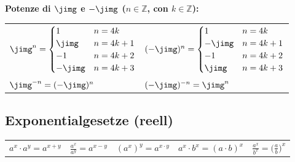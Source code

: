 \noindent\textbf{Potenze di $\jimg$ e $-\jimg$ ($n \in \mathbb{Z}$, con $k \in \mathbb{Z}$):}
\begin{center}
\begin{tabular}{ll}
    $\jimg^n = \begin{cases} 1 & n = 4k \\ \jimg & n = 4k+1 \\ -1 & n = 4k+2 \\ -\jimg & n = 4k+3 \end{cases}$ & 
    $(-\jimg)^n = \begin{cases} 1 & n = 4k \\ -\jimg & n = 4k+1 \\ -1 & n = 4k+2 \\ \jimg & n = 4k+3 \end{cases}$ \\
    \noalign{\vspace{0.15cm}}
    $\jimg^{-n} = (-\jimg)^n$ & 
    $(-\jimg)^{-n} = \jimg^n$
\end{tabular}
\end{center}

\subsection{Exponentialgesetze (reell)}

\begin{tabular}{lllll}
    $a^x \cdot a^y = a^{x + y}$ & $\frac{a^x}{a^y} = a^{x-y}$ & $(a^x)^y = a^{x \cdot y}$ & $a^x \cdot b^x = (a \cdot b)^x$ & $\frac{a^x}{b^x} = \big( \frac{a}{b} \big) ^x$
\end{tabular}



